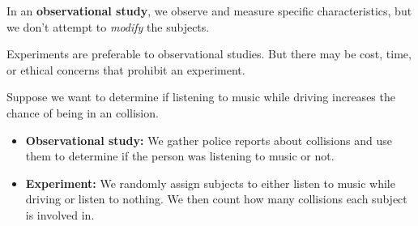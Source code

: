 \documentclass{beamer}
\begin{document}
\begin{frame}
\begin{definition}
In an \textbf{observational study}, we observe and measure specific characteristics, but we don't attempt to \emph{modify} the subjects.
\end{definition}\pause

\begin{note}
Experiments are preferable to observational studies. But there may be cost, time, or ethical concerns that prohibit an experiment.
\end{note}\pause

\begin{example}
Suppose we want to determine if listening to music while driving increases the chance of being in an collision.\pause
\begin{itemize}
\item \textbf{Observational study:} We gather police reports about collisions and use them to determine if the person was listening to music or not.\pause
\item \textbf{Experiment:} We randomly assign subjects to either listen to music while driving or listen to nothing. We then count how many collisions each subject is involved in.
\end{itemize}
\end{example}
\end{frame}
\end{document}
